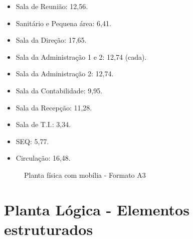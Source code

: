 \documentclass[	DIV=calc,%
							paper=a4,%
							fontsize=12pt,%
							onecolumn]{scrartcl}	 					%
\begin{document}
\begin{itemize}
	\item Sala de Reunião: 12,56.
	\item Sanitário e Pequena área: 6,41.
	\item Sala da Direção: 17,65.
	\item Sala da Administração 1 e 2: 12,74 (cada).
	\item Sala da Administração 2: 12,74.
	\item Sala da Contabilidade: 9,95.
	\item Sala da Recepção: 11,28.
	\item Sala de T.I.: 3,34.
	\item SEQ: 5,77.
	\item Circulação: 16,48.
	
	
\end{itemize}


\clearpage 
\thispagestyle{plain}

\recalctypearea



\begin{figure}
	\noindent{}
	\caption{Planta física com mobília - Formato A3}
	\label{fig1}
\end{figure}

\clearpage
{}
\recalctypearea


\section{Planta Lógica - Elementos estruturados}
\end{document}
